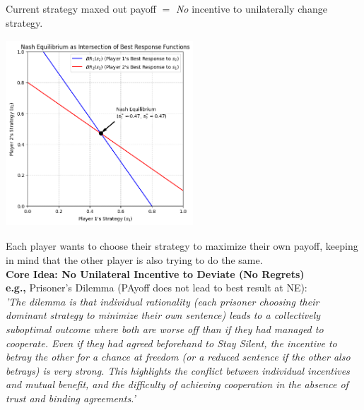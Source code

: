 \documentclass[../Main.tex]{subfiles}
\begin{document}
Current strategy maxed out payoff $=$ \textit{No} incentive to unilaterally change strategy.
\begin{center}
    \includegraphics[width = 7cm, height = 7cm]{files/nash.png}
\end{center}


Each player wants to choose their strategy to maximize their own payoff, keeping in mind that the other player is also trying to do the same.\\

\textbf{Core Idea: No Unilateral Incentive to Deviate (No Regrets)}\\

\textbf{e.g.,} Prisoner's Dilemma (PAyoff does not lead to best result at NE):\\

\textit{'The dilemma is that individual rationality (each prisoner choosing their dominant strategy to minimize their own sentence) leads to a collectively suboptimal outcome where both are worse off than if they had managed to cooperate. Even if they had agreed beforehand to Stay Silent, the incentive to betray the other for a chance at freedom (or a reduced sentence if the other also betrays) is very strong. This highlights the conflict between individual incentives and mutual benefit, and the difficulty of achieving cooperation in the absence of trust and binding agreements.'}
\end{document}
